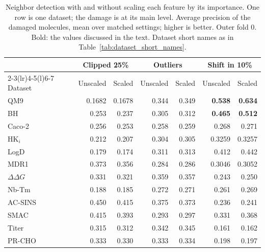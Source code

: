 \begin{table}[htbp]
\centering
\begin{tabular}{@{}lrrrrrr@{}}
\toprule
 & \multicolumn{2}{c}{Clipped 25\%} & \multicolumn{2}{c}{Outliers} & \multicolumn{2}{c}{Shift in 10\%} \\
\cmidrule(lr){2-3}\cmidrule(lr){4-5}\cmidrule(l){6-7}
Dataset & Unscaled & Scaled & Unscaled & Scaled & Unscaled & Scaled \\
\midrule
QM9 & 0.1682 & 0.1678 & 0.344 & 0.349 & \textbf{0.538} & \textbf{0.634} \\
BH & 0.253 & 0.237 & 0.305 & 0.312 & \textbf{0.465} & \textbf{0.512} \\
Caco-2 & 0.256 & 0.253 & 0.258 & 0.259 & 0.268 & 0.271 \\
HK$_i$ & 0.212 & 0.207 & 0.304 & 0.305 & 0.3259 & 0.3257 \\
LogD & 0.179 & 0.174 & 0.311 & 0.313 & 0.412 & 0.442 \\
MDR1 & 0.373 & 0.356 & 0.284 & 0.286 & 0.3046 & 0.3052 \\
$\Delta\Delta G$ & 0.331 & 0.321 & 0.359 & 0.357 & 0.243 & 0.250 \\
Nb-Tm & 0.188 & 0.185 & 0.272 & 0.271 & 0.261 & 0.269 \\
AC-SINS & 0.450 & 0.415 & 0.375 & 0.373 & 0.236 & 0.241 \\
SMAC & 0.415 & 0.393 & 0.293 & 0.297 & 0.331 & 0.368 \\
Titer & 0.315 & 0.312 & 0.342 & 0.345 & 0.161 & 0.162 \\
PR-CHO & 0.333 & 0.330 & 0.333 & 0.334 & 0.198 & 0.197 \\
\bottomrule
\end{tabular}
\caption[Scaling features by importance before finding neighbors.]{Neighbor detection with and without scaling each feature by its importance. One row is one dataset; the damage is at its main level. Average precision of the damaged molecules, mean over matched settings; higher is better. Outer fold 0. Bold: the values discussed in the text. Dataset short names as in Table~\ref{tab:dataset_short_names}.}
\label{tab:noise:res:importance_scaling}
\end{table}

